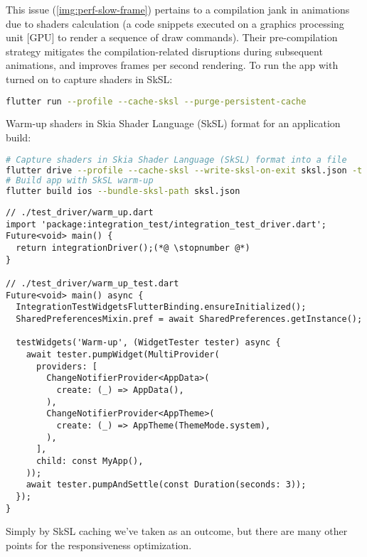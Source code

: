 
\noindent This issue (\cref{img:perf-slow-frame}) pertains to a compilation jank in animations due to shaders 
calculation (a code snippets executed on a graphics processing unit [GPU] to render a sequence of draw commands). 
Their pre-compilation strategy mitigates the compilation-related disruptions during subsequent animations, and improves 
frames per second rendering. To run the app with  turned on to capture shaders in SkSL:

\begin{lstlisting}[language=bash]
flutter run --profile --cache-sksl --purge-persistent-cache
\end{lstlisting}

\noindent Warm-up shaders in Skia Shader Language (SkSL) format for an application build:

\begin{lstlisting}[language=bash]
# Capture shaders in Skia Shader Language (SkSL) format into a file
flutter drive --profile --cache-sksl --write-sksl-on-exit sksl.json -t test_driver/warm_up.dart
# Build app with SkSL warm-up
flutter build ios --bundle-sksl-path sksl.json
\end{lstlisting}

\begin{lstlisting}
// ./test_driver/warm_up.dart
import 'package:integration_test/integration_test_driver.dart';
Future<void> main() {
  return integrationDriver();(*@ \stopnumber @*)
}

// ./test_driver/warm_up_test.dart
Future<void> main() async {
  IntegrationTestWidgetsFlutterBinding.ensureInitialized();
  SharedPreferencesMixin.pref = await SharedPreferences.getInstance();

  testWidgets('Warm-up', (WidgetTester tester) async {
    await tester.pumpWidget(MultiProvider(
      providers: [
        ChangeNotifierProvider<AppData>(
          create: (_) => AppData(),
        ),
        ChangeNotifierProvider<AppTheme>(
          create: (_) => AppTheme(ThemeMode.system),
        ),
      ],
      child: const MyApp(),
    ));
    await tester.pumpAndSettle(const Duration(seconds: 3));
  });
}
\end{lstlisting}

\noindent Simply by SkSL caching we've taken  as an outcome, but there are many other points for 
the responsiveness optimization.

